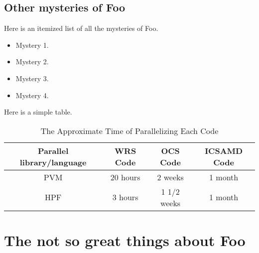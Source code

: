 \documentclass{bsu-ms}
\begin{document}
\section{Other mysteries of Foo}

Here is an itemized list of all the mysteries of Foo.
\begin{itemize}
\item Mystery 1.
\item Mystery 2.
\item Mystery 3.
\item Mystery 4.
\end{itemize}


Here is a simple table.

\begin{table}[h] %
\caption{The Approximate Time of Parallelizing Each Code}
\label{table4}
\centering %
\begin{tabular}{|c|c|c|c|}\hline \hline
Parallel library/language  &WRS Code  &OCS Code  &ICSAMD Code\\ \hline
PVM                        &20 hours  &2 weeks   &1 month\\ \hline
HPF                        &3 hours   &1 1/2 weeks  &1 month\\ \hline
\end{tabular}
\end{table}


%
%

\chapter{The not so great things about Foo}
\end{document}
